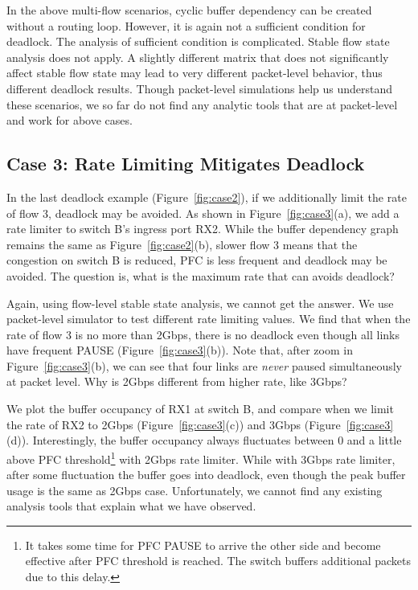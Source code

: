In the above multi-flow scenarios, cyclic buffer dependency can be created without 
a routing loop. However, it is again not a sufficient condition for deadlock. The analysis of sufficient
condition is complicated. Stable flow state analysis does not apply.
A slightly different matrix that does not significantly affect stable flow state may lead
to very different packet-level behavior, thus different deadlock results. 
Though packet-level simulations help us understand these scenarios, we so far do not find
any analytic tools that are at packet-level and work for above cases.

\secspace
\subsection{Case 3: Rate Limiting Mitigates Deadlock}
\secspace

In the last deadlock example (Figure~\ref{fig:case2}), if we additionally limit the rate of flow 3, deadlock
may be avoided.  As shown in Figure~\ref{fig:case3}(a), we add a rate limiter to switch B's
ingress port RX2. While the buffer dependency graph remains the same as Figure~\ref{fig:case2}(b), 
slower flow 3 means that the congestion on switch B is reduced, PFC is less
frequent and deadlock may be avoided. The question is, what is the maximum rate that can
avoids deadlock?

Again, using flow-level stable state analysis, we cannot get the answer. We use packet-level simulator
to test different rate limiting values. We find that when the rate of flow 3 is no more than 2Gbps,
there is no deadlock even though all links have frequent PAUSE (Figure~\ref{fig:case3}(b)).
Note that, after zoom in Figure~\ref{fig:case3}(b), we can see that four links are {\em never} paused
simultaneously at packet level. Why is 2Gbps different from higher rate, like 3Gbps?

We plot the buffer occupancy of RX1 at switch B, and compare when we limit the rate of RX2 to 2Gbps
(Figure~\ref{fig:case3}(c)) and 3Gbps (Figure~\ref{fig:case3}(d)). Interestingly, the buffer occupancy
always fluctuates between 0 and a little above PFC threshold\footnote{It takes some time for PFC PAUSE 
to arrive the other side and become effective after PFC threshold is reached.
The switch buffers additional packets due to this delay.} with 2Gbps rate limiter. While with 3Gbps rate
limiter, after some fluctuation the buffer goes into deadlock, even though the peak buffer usage is the same 
as 2Gbps case. Unfortunately, we cannot find any existing analysis tools that explain 
what we have observed. 

